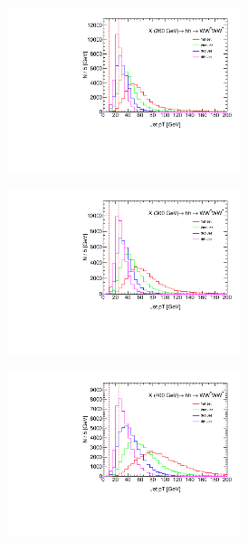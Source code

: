 \begin{figure}
\centering
\begin{subfigure}[b]{0.45\textwidth}
 \includegraphics[width=0.75\textwidth, angle =-90]{fig/SigTopo/pt_jet_mH260.pdf}\caption{}
 \label{fig:SigTopo:pt_jet_mH260}
\end{subfigure}
\begin{subfigure}[b]{0.45\textwidth}
 \includegraphics[width=0.75\textwidth, angle =-90]{fig/SigTopo/pt_jet_mH300.pdf}\caption{}
 \label{fig:SigTopo:pt_jet_mH300}
\end{subfigure}
\begin{subfigure}[b]{0.45\textwidth}
 \includegraphics[width=0.75\textwidth, angle =-90]{fig/SigTopo/pt_jet_mH400.pdf}\caption{}

\end{subfigure}
\end{figure}

